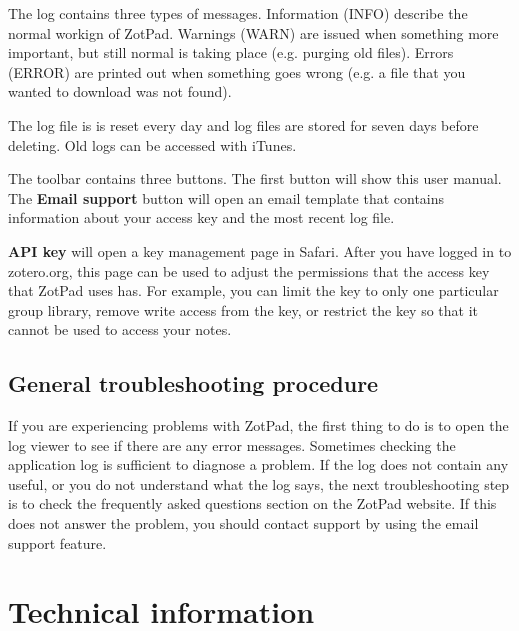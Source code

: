 \documentclass[oneside, openany, 12pt]{tufte-book}
\newcommand{\iphone}[1]{#1}
\newcommand{\ipad}[1]{}
\newcommand{\image}[2]{
	\center
	\fbox{\texttt{[image: images/iPhone/\{\#2]}}}

	\refstepcounter{figure}
	\smallskip\noindent\small Figure \thefigure: #1
	\label{#2}
	}
\newcommand{\iphone}[1]{}
\newcommand{\ipad}[1]{#1}
\newcommand{\image}[2]{
	\caption{#1}
	\label{#2}
	\fbox{\texttt{[image: images/iPad/\{\#2]}}}
	}
\begin{document}
The log contains three types of messages. Information (INFO) describe the normal workign of ZotPad. Warnings (WARN) are issued when something more important, but still normal is taking place (e.g. purging old files). Errors (ERROR) are printed out when something goes wrong (e.g. a file that you wanted to download was not found).

The log file is is reset every day and log files are stored for seven days before deleting. Old logs can be accessed with iTunes. 

\begin{figure}
\image{ZotPad log viewer}{LogView.png}
\end{figure}

The toolbar contains \ipad{four}\iphone{three }buttons. The first button will show this user manual\ipad{ and the second button will open the support pages on the ZotPad website. These pages contain the most up to date documentation and are complementary to this user manual}. The \textbf{Email support} button will open an email template that contains information about your access key and the most recent log file.

\textbf{\ipad{Manage }API key} will open a key management page in Safari. After you have logged in to zotero.org, this page can be used to adjust the permissions that the access key that ZotPad uses has. For example, you can limit the key to only one particular group library, remove write access from the key, or restrict the key so that it cannot be used to access your notes.

\section{General troubleshooting procedure}

If you are experiencing problems with ZotPad, the first thing to do is to open the log viewer to see if there are any error messages. Sometimes checking the application log is sufficient to diagnose a problem. If the log does not contain any useful, or you do not understand what the log says, the next troubleshooting step is to check the frequently asked questions section on the ZotPad website. If this does not answer the problem, you should contact support by using the email support feature.


\chapter{Technical information}
\end{document}
